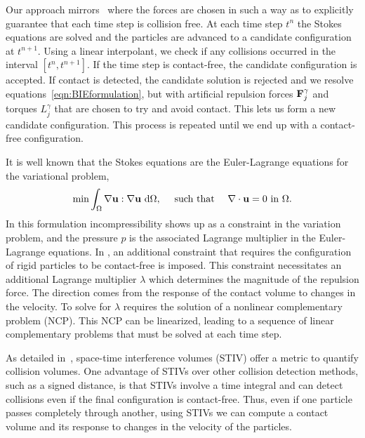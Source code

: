 \documentclass[preprint, 10pt]{elsarticle}
\begin{document}
Our approach mirrors~\cite{Lu2017} where the forces are chosen in such a
way as to explicitly guarantee that each time step is collision free.
At each time step $t^n$ the Stokes equations are solved and the
particles are advanced to a candidate configuration at $t^{n+1}$.  Using
a linear interpolant, we check if any collisions occurred in the
interval $[t^n,t^{n+1}]$.  If the time step is contact-free, the
candidate configuration is accepted.  If contact is detected, the
candidate solution is rejected and we resolve
equations~\eqref{eqn:BIEformulation}, but with artificial repulsion
forces ${\mathbf{F}}^\gamma_j$ and torques $L^\gamma_j$ that are chosen to try
and avoid contact.  This lets us form a new candidate configuration.
This process is repeated until we end up with a contact-free
configuration.

It is well known that the Stokes equations  are the Euler-Lagrange
equations for the variational problem, 
\begin{align*}
  \min \int_{\Omega} \nabla{\mathbf{u}}:\nabla{\mathbf{u}}~\text{d}\Omega,
  \quad\text{ such that }\quad \nabla\cdot{\mathbf{u}} = 0 \text{ in }\Omega.
\end{align*} 
In this formulation incompressibility shows up as a constraint in the
variation problem, and the pressure $p$ is the associated Lagrange
multiplier in the Euler-Lagrange equations. In \cite{Lu2017}, an
additional constraint that requires the configuration of rigid particles
to be contact-free is imposed. This constraint necessitates an
additional Lagrange multiplier $\lambda$ which determines the magnitude
of the repulsion force. The direction comes from the response of the
contact volume to changes in the velocity. To solve for $\lambda$
requires the solution of a nonlinear complementary problem (NCP). This
NCP can be linearized, leading to a sequence of linear complementary
problems that must be solved at each time step.

As detailed in~\cite{Lu2017, Harmon2011}, space-time interference
volumes (STIV) offer a metric to quantify collision volumes. One
advantage of STIVs over other collision detection methods, such as a
signed distance, is that STIVs involve a time integral and can detect
collisions even if the final configuration is contact-free. Thus, even
if one particle passes completely through another, using STIVs we can
compute a contact volume and its response to changes in the velocity of
the particles.
\end{document}
